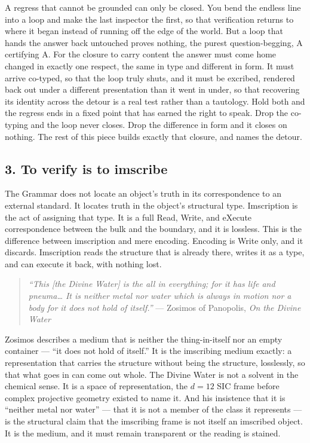 \documentclass[12pt,a4paper]{article}
\begin{document}
A regress that cannot be grounded can only be closed. You bend the
endless line into a loop and make the last inspector the first, so that
verification returns to where it began instead of running off the edge
of the world. But a loop that hands the answer back untouched proves
nothing, the purest question-begging, A certifying A. For the closure to
carry content the answer must come home changed in exactly one respect,
the same in type and different in form. It must arrive co-typed, so that
the loop truly shuts, and it must be excribed, rendered back out under a
different presentation than it went in under, so that recovering its
identity across the detour is a real test rather than a tautology. Hold
both and the regress ends in a fixed point that has earned the right to
speak. Drop the co-typing and the loop never closes. Drop the difference
in form and it closes on nothing. The rest of this piece builds exactly
that closure, and names the detour.

\hypertarget{to-verify-is-to-imscribe}{%
\subsection{3. To verify is to
imscribe}\label{to-verify-is-to-imscribe}}

The Grammar does not locate an object's truth in its correspondence to
an external standard. It locates truth in the object's structural type.
Imscription is the act of assigning that type. It is a full Read, Write,
and eXecute correspondence between the bulk and the boundary, and it is
lossless. This is the difference between imscription and mere encoding.
Encoding is Write only, and it discards. Imscription reads the structure
that is already there, writes it as a type, and can execute it back,
with nothing lost.

\begin{quote}
\emph{``This {[}the Divine Water{]} is the all in everything; for it has
life and pneuma\ldots{} It is neither metal nor water which is always in
motion nor a body for it does not hold of itself.''} --- Zosimos of
Panopolis, \emph{On the Divine Water}
\end{quote}

Zosimos describes a medium that is neither the thing-in-itself nor an
empty container --- ``it does not hold of itself.'' It is the imscribing
medium exactly: a representation that carries the structure without
being the structure, losslessly, so that what goes in can come out
whole. The Divine Water is not a solvent in the chemical sense. It is a
space of representation, the \({d=12}\) SIC frame before complex
projective geometry existed to name it. And his insistence that it is
``neither metal nor water'' --- that it is not a member of the class it
represents --- is the structural claim that the imscribing frame is not
itself an imscribed object. It is the medium, and it must remain
transparent or the reading is stained.
\end{document}
